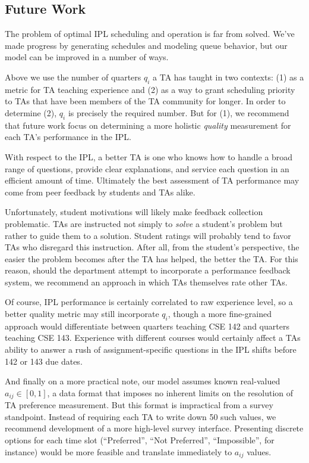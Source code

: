 \documentclass{article}
\begin{document}
\begin{multicols}{2}
\section*{Future Work}

The problem of optimal IPL scheduling and operation is far from solved. We've made progress by generating schedules and modeling queue behavior, but our model can be improved in a number of ways.

Above we use the number of quarters $q_i$ a TA has taught in two contexts: (1) as a metric for TA teaching experience and (2) as a way to grant scheduling priority to TAs that have been members of the TA community for longer. In order to determine (2), $q_i$ is precisely the required number. But for (1), we recommend that future work focus on determining a more holistic \textit{quality} measurement for each TA's performance in the IPL.

With respect to the IPL, a better TA is one who knows how to handle a broad range of questions, provide clear explanations, and service each question in an efficient amount of time. Ultimately the best assessment of TA performance may come from peer feedback by students and TAs alike.

Unfortunately, student motivations will likely make feedback collection problematic. TAs are instructed not simply to \textit{solve} a student's problem but rather to guide them to a solution. Student ratings will probably tend to favor TAs who disregard this instruction. After all, from the student's perspective, the easier the problem becomes after the TA has helped, the better the TA. For this reason, should the department attempt to incorporate a performance feedback system, we recommend an approach in which TAs themselves rate other TAs.

Of course, IPL performance is certainly correlated to raw experience level, so a better quality metric may still incorporate $q_i$, though a more fine-grained approach would differentiate between quarters teaching CSE 142 and quarters teaching CSE 143. Experience with different courses would certainly affect a TAs ability to answer a rush of assignment-specific questions in the IPL shifts before 142 or 143 due dates.

And finally on a more practical note, our model assumes known real-valued $a_{ij} \in [0,1]$, a data format that imposes no inherent limits on the resolution of TA preference measurement. But this format is impractical from a survey standpoint. Instead of requiring each TA to write down 50 such values, we recommend development of a more high-level survey interface. Presenting discrete options for each time slot (``Preferred'', ``Not Preferred'', ``Impossible'', for instance) would be more feasible and translate immediately to $a_{ij}$ values.


\end{multicols}
\end{document}
